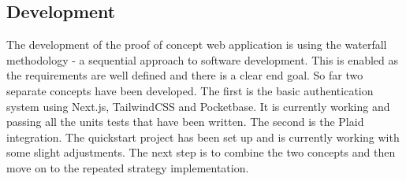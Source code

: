 \subsection{Development}
The development of the proof of concept web application is using the waterfall methodology - a sequential approach to software development. This is enabled as the requirements are well defined and there is a clear end goal. So far two separate concepts have been developed. The first is the basic authentication system using Next.js, TailwindCSS and Pocketbase. It is currently working and passing all the units tests that have been written. The second is the Plaid integration. The quickstart project has been set up and is currently working with some slight adjustments. The next step is to combine the two concepts and then move on to the repeated strategy implementation.

